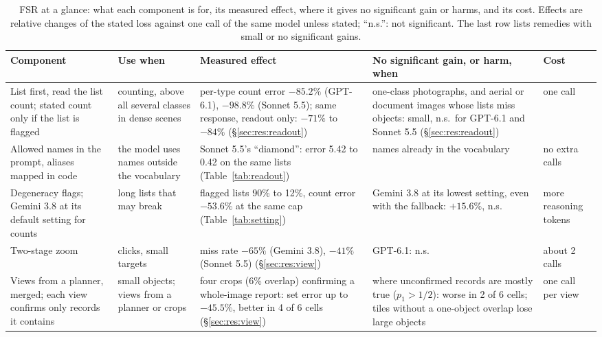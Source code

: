 \begin{table}[tp]
\iflatexml\else\centering\fi\footnotesize\setlength{\tabcolsep}{3.5pt}\renewcommand{\arraystretch}{1.15}
\caption{FSR at a glance: what each component is for, its measured effect, where it gives no significant gain or harms, and its cost. Effects are relative changes of the stated loss against one call of the same model unless stated; ``n.s.'': not significant. The last row lists remedies with small or no significant gains.}\label{tab:recipe}
\begin{tabular}{@{}>{\raggedright\arraybackslash}p{2.5cm}>{\raggedright\arraybackslash}p{2.6cm}>{\raggedright\arraybackslash}p{3.8cm}>{\raggedright\arraybackslash}p{4.0cm}>{\raggedright\arraybackslash}p{1.9cm}@{}}\toprule
Component & Use when & Measured effect & No significant gain, or harm, when & Cost \\\midrule
List first, read the list count; stated count only if the list is flagged & counting, above all several classes in dense scenes & per-type count error $-85.2\%$ (GPT-6.1), $-98.8\%$ (Sonnet 5.5); same response, readout only: $-71\%$ to $-84\%$ (\S\ref{sec:res:readout}) & one-class photographs, and aerial or document images whose lists miss objects: small, n.s.\ for GPT-6.1 and Sonnet 5.5 (\S\ref{sec:res:readout}) & one call \\
Allowed names in the prompt, aliases mapped in code & the model uses names outside the vocabulary & Sonnet 5.5's ``diamond'': error 5.42 to 0.42 on the same lists (Table~\ref{tab:readout}) & names already in the vocabulary & no extra calls \\
Degeneracy flags; Gemini 3.8 at its default setting for counts & long lists that may break & flagged lists 90\% to 12\%, count error $-53.6\%$ at the same cap (Table~\ref{tab:setting}) & Gemini 3.8 at its lowest setting, even with the fallback: $+15.6\%$, n.s. & more reasoning tokens \\
Two-stage zoom & clicks, small targets & miss rate $-65\%$ (Gemini 3.8), $-41\%$ (Sonnet 5.5) (\S\ref{sec:res:view}) & GPT-6.1: n.s. & about 2 calls \\
Views from a planner, merged; each view confirms only records it contains & small objects; views from a planner or crops & four crops (6\% overlap) confirming a whole-image report: set error up to $-45.5\%$, better in 4 of 6 cells (\S\ref{sec:res:view}) & where unconfirmed records are mostly true ($p_1>1/2$): worse in 2 of 6 cells; tiles without a one-object overlap lose large objects & one call per view \\

\end{tabular}
\end{table}
